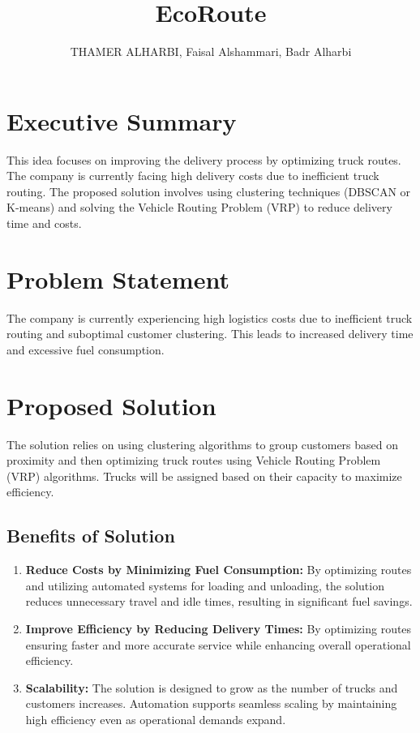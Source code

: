 \documentclass[a4paper,12pt, final]{article}
\title{EcoRoute}
\author{THAMER ALHARBI, Faisal Alshammari, Badr Alharbi}
\begin{document}
\maketitle

\tableofcontents
\listoffigures
\listoftables

\newpage
\section{Executive Summary}
This idea focuses on improving the delivery process by optimizing truck routes. The company is
currently facing high delivery costs due to inefficient truck routing.
The proposed solution involves using clustering techniques (DBSCAN or K-means) and solving the
Vehicle Routing Problem (VRP) to reduce delivery time and costs.

\section{Problem Statement}
The company is currently experiencing high logistics costs due to inefficient truck routing and
suboptimal customer clustering. This leads to increased delivery time and excessive fuel
consumption.

\section{Proposed Solution}
The solution relies on using clustering algorithms to group customers based on proximity and then
optimizing truck routes using Vehicle Routing Problem (VRP) algorithms. Trucks will be assigned
based on their capacity to maximize efficiency.

\subsection{Benefits of Solution}
\begin{enumerate}
    \item \textbf{Reduce Costs by Minimizing Fuel Consumption:} By optimizing routes and utilizing automated systems for loading and unloading, the solution reduces unnecessary travel and idle times, resulting in significant fuel savings. 
    \item \textbf{Improve Efficiency by Reducing Delivery Times:} By optimizing routes ensuring faster and more accurate service while enhancing overall operational efficiency.
    \item \textbf{Scalability:} The solution is designed to grow as the number of trucks and customers increases. Automation supports seamless scaling by maintaining high efficiency even as operational demands expand.
\end{enumerate}
\end{document}
